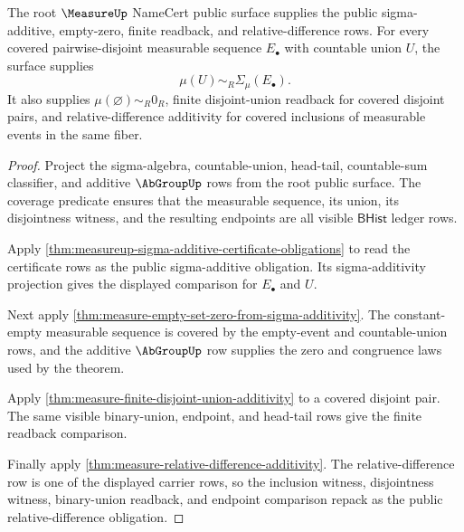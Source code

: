 \begin{theorem}
\label{thm:measure-root-sigma-additive-public-obligation}
The root $\MeasureUp$ NameCert public surface supplies the public
sigma-additive, empty-zero, finite readback, and relative-difference rows.
For every covered pairwise-disjoint measurable sequence $E_\bullet$ with
countable union $U$, the surface supplies
$$
\mu(U)\sim_R\Sigma_\mu(E_\bullet).
$$
It also supplies $\mu(\varnothing)\sim_R0_R$, finite disjoint-union readback
for covered disjoint pairs, and relative-difference additivity for covered
inclusions of measurable events in the same fiber.
\end{theorem}
\begin{proof}
Project the sigma-algebra, countable-union, head-tail, countable-sum
classifier, and additive $\AbGroupUp$ rows from the root public surface. The
coverage predicate ensures that the measurable sequence, its union, its
disjointness witness, and the resulting endpoints are all visible
$\mathsf{BHist}$ ledger rows.

Apply \autoref{thm:measureup-sigma-additive-certificate-obligations} to read
the certificate rows as the public sigma-additive obligation. Its
sigma-additivity projection gives the displayed comparison for
$E_\bullet$ and $U$.

Next apply \autoref{thm:measure-empty-set-zero-from-sigma-additivity}. The
constant-empty measurable sequence is covered by the empty-event and
countable-union rows, and the additive $\AbGroupUp$ row supplies the zero and
congruence laws used by the theorem.

Apply \autoref{thm:measure-finite-disjoint-union-additivity} to a covered
disjoint pair. The same visible binary-union, endpoint, and head-tail rows
give the finite readback comparison.

Finally apply \autoref{thm:measure-relative-difference-additivity}. The
relative-difference row is one of the displayed carrier rows, so the inclusion
witness, disjointness witness, binary-union readback, and endpoint comparison
repack as the public relative-difference obligation.
\end{proof}

